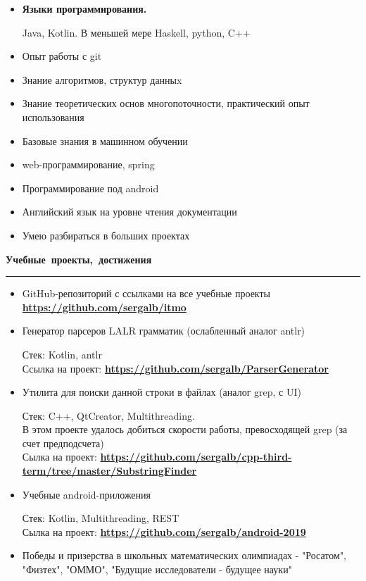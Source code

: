 \documentclass[12pt, a4paper]{report}
\begin{document}
    \begin{itemize}

        \item \textbf{Языки программирования.}

        Java, Kotlin. В меньшей мере Haskell, python, C++

        \item Опыт работы с git
        \item Знание алгоритмов, структур данныx
        \item Знание теоретических основ многопоточности, практический опыт использования
        \item Базовые знания в машинном обучении
        \item web-программирование, spring
        \item Программирование под android
        \item Английский язык на уровне чтения документации
        \item Умею разбираться в больших проектах\\
    \end{itemize}

    \par\hbox{\large\textbf{Учебные проекты, достижения}}\kern5pt\hrule\kern5pt
    \begin{itemize}

        \item GitHub-репозиторий с ссылками на все учебные проекты \textbf{\url{https://github.com/sergalb/itmo}}

        \item Генератор парсеров LALR грамматик (ослабленный аналог antlr)

        Стек: Kotlin, antlr\\
        Ссылка на проект:
        \textbf{
        \url{https://github.com/sergalb/ParserGenerator}
        }

        \item Утилита для поиски данной строки в файлах (аналог grep, с UI)

        Стек: C++, QtCreator, Multithreading.\\
        В этом проекте удалось добиться скорости работы, превосходящей grep (за счет предподсчета)\\
        Сылка на проект:
        \textbf{
        \url{https://github.com/sergalb/cpp-third-term/tree/master/SubstringFinder}
        }

        \item Учебные android-приложения

        Стек: Kotlin, Multithreading, REST\\
        Сылка на проект:
        \textbf{
        \url{https://github.com/sergalb/android-2019}
        }

        \item Победы и призерства в школьных математических олимпиадах - "Росатом", "Физтех", "ОММО", "Будущие исследователи - будущее науки"

    \end{itemize}
\end{document}
